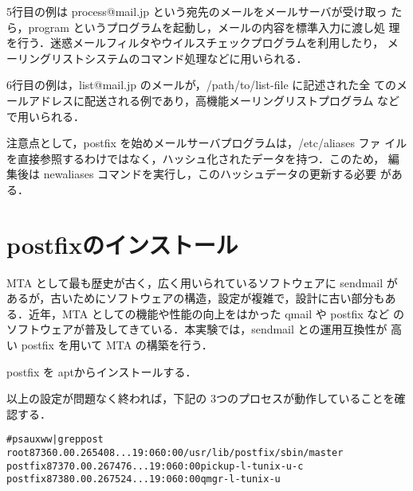 5行目の例は process@mail.jp という宛先のメールをメールサーバが受け取っ
たら，program というプログラムを起動し，メールの内容を標準入力に渡し処
理を行う．迷惑メールフィルタやウイルスチェックプログラムを利用したり，
メーリングリストシステムのコマンド処理などに用いられる．

6行目の例は，list@mail.jp のメールが，/path/to/list-file に記述された全
てのメールアドレスに配送される例であり，高機能メーリングリストプログラム
などで用いられる．

注意点として，postfix を始めメールサーバプログラムは，/etc/aliases ファ
イルを直接参照するわけではなく，ハッシュ化されたデータを持つ．このため，
編集後は newaliases コマンドを実行し，このハッシュデータの更新する必要
がある．

%
%
\section{postfixのインストール}
MTA として最も歴史が古く，広く用いられているソフトウェアに sendmail が
あるが，古いためにソフトウェアの構造，設定が複雑で，設計に古い部分もあ
る．近年，MTA としての機能や性能の向上をはかった qmail や postfix など
のソフトウェアが普及してきている．本実験では，sendmail との運用互換性が
高い postfix を用いて MTA の構築を行う．


postfix を aptからインストールする．



以上の設定が問題なく終われば，下記の 3つのプロセスが動作していることを確認する．

\begin{center}
\begin{breakbox}
\begin{alltt}
# ps auxww | grep post
root      8736  0.0  0.2  65408  ...19:06   0:00 /usr/lib/postfix/sbin/master
postfix   8737  0.0  0.2  67476  ...19:06   0:00 pickup -l -t unix -u -c
postfix   8738  0.0  0.2  67524  ...19:06   0:00 qmgr -l -t unix -u
\end{alltt}
\end{breakbox}
\end{center}

